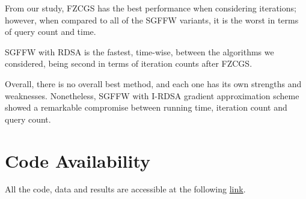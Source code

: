 \documentclass[10pt,twocolumn,letterpaper]{article}
\begin{document}
From our study, FZCGS has the best performance when considering iterations;
however, when compared to all of the SGFFW variants, it is the worst in terms
of query count and time.

SGFFW with RDSA is the fastest, time-wise, between the algorithms we considered,
being second in terms of iteration counts after FZCGS.

Overall, there is no overall best method, and each one has its own strengths and weaknesses.
Nonetheless, SGFFW with I-RDSA gradient approximation scheme showed a remarkable
compromise between running time, iteration count and query count.


\section{Code Availability}

All the code, data and results are accessible at the following \href{https://github.com/marcouderzo/FW-AdversarialAttacks}{link}.

{\small


}
\end{document}
